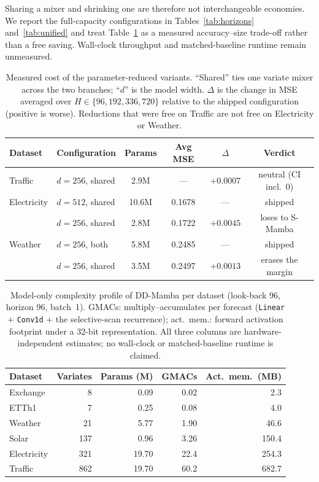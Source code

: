 \documentclass[review,12pt]{elsarticle}
\newcommand{\model}{DD-Mamba}
\begin{document}
Sharing a mixer and shrinking one are therefore not interchangeable
economies. We report the full-capacity configurations in
Tables~\ref{tab:horizons} and~\ref{tab:unified} and treat
Table~\ref{tab:capacity} as a measured accuracy--size trade-off rather than a
free saving. Wall-clock throughput and matched-baseline runtime remain
unmeasured.

\begin{table}[tb]
\centering
\caption{Measured cost of the parameter-reduced variants. ``Shared'' ties one
variate mixer across the two branches; ``$d$'' is the model width. $\Delta$ is
the change in MSE averaged over $H\in\{96,192,336,720\}$ relative to the
shipped configuration (positive is worse). Reductions that were free on
Traffic are not free on Electricity or Weather.}
\label{tab:capacity}
\scriptsize
\setlength{\tabcolsep}{4pt}
\begin{tabular}{@{}llcccc@{}}
\toprule
Dataset & Configuration & Params & Avg MSE & $\Delta$ & Verdict \\
\midrule
Traffic & $d{=}256$, shared & 2.9M & --- & $+0.0007$ & neutral (CI incl.\ 0) \\
\midrule
Electricity & $d{=}512$, shared & 10.6M & 0.1678 & --- & shipped \\
            & $d{=}256$, shared & 2.8M & 0.1722 & $+0.0045$ & loses to S-Mamba \\
\midrule
Weather & $d{=}256$, both & 5.8M & 0.2485 & --- & shipped \\
        & $d{=}256$, shared & 3.5M & 0.2497 & $+0.0013$ & erases the margin \\
\bottomrule
\end{tabular}
\end{table}

\begin{table}[tb]
\centering
\caption{Model-only complexity profile of \model{} per dataset (look-back 96,
horizon 96, batch~1). GMACs: multiply--accumulates per forecast
(\texttt{Linear} $+$ \texttt{Conv1d} $+$ the selective-scan recurrence);
act.\ mem.: forward activation footprint under a 32-bit representation. All three columns are
hardware-independent estimates; no wall-clock or matched-baseline runtime is
claimed.}
\label{tab:efficiency}
\begin{tabular}{@{}lrrrr@{}}
\toprule
Dataset & Variates & Params (M) & GMACs & Act.\ mem.\ (MB) \\
\midrule
Exchange & 8 & 0.09 & 0.02 & 2.3 \\
ETTh1 & 7 & 0.25 & 0.08 & 4.0 \\
Weather & 21 & 5.77 & 1.90 & 46.6 \\
Solar & 137 & 0.96 & 3.26 & 150.4 \\
Electricity & 321 & 19.70 & 22.4 & 254.3 \\
Traffic & 862 & 19.70 & 60.2 & 682.7 \\
\bottomrule
\end{tabular}
\end{table}
\end{document}
